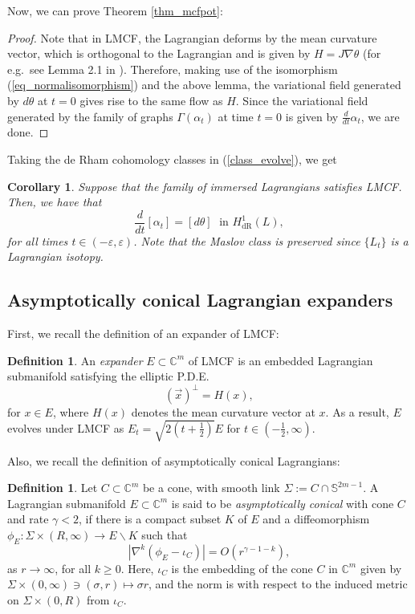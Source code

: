 \documentclass[10pt, a4paper]{article}
\theoremstyle{plain}%
\newtheorem{coro}[theorem]{Corollary}
\theoremstyle{definition}
\newtheorem{defn}[theorem]{Definition}
\numberwithin{figure}{section}
\numberwithin{equation}{section}
\newcommand{\bC}{\mathbb{C}}
\newcommand{\bS}{\mathbb{S}}
\begin{document}
Now, we can prove Theorem \ref{thm_mcfpot}:	

\begin{proof}
	Note that in LMCF, the Lagrangian deforms by the mean curvature vector, which is orthogonal to the Lagrangian and is given by $H=J\nabla \theta$ (for e.g.\ see Lemma 2.1 in \cite{TY02}). Therefore, making use of the isomorphism (\ref{eq_normalisomorphism}) and the above lemma, the variational field generated by $d\theta$ at $t=0$ gives rise to the same flow as $H$. Since the variational field generated by the family of graphs $\Gamma(\alpha_t)$ at time $t=0$ is given by $\frac{d}{dt}\alpha_t$, we are done.
\end{proof}

Taking the de Rham cohomology classes in (\ref{class_evolve}), we get
\begin{coro}\label{cor_classevolve}
    Suppose that the family of immersed Lagrangians satisfies LMCF. Then, we have that 
    \begin{equation}\label{eq_mcfpotcoh}
      \frac{d}{dt}[\alpha_t]=[d\theta] \; \textrm{ in } H^1_{\textrm{dR}}(L),
    \end{equation}
    for all times $t\in(-\varepsilon,\varepsilon)$. Note that the Maslov class is preserved since $\{L_t\}$ is a Lagrangian isotopy.
\end{coro}



\subsection{Asymptotically conical Lagrangian expanders}

First, we recall the definition of an expander of LMCF:
\begin{defn}
	An \textit{expander} $E\subset \mathbb{C}^m$ of LMCF is an embedded Lagrangian submanifold satisfying the elliptic P.D.E.
	\[
	(\overrightarrow{x})^\perp =  H(x),
	\]
	for $x\in E$, where $H(x)$ denotes the mean curvature vector at $x$. As a result, $E$ evolves under LMCF as $E_t = \sqrt{2(t+\frac{1}{2})}E$ for $t\in(-\frac{1}{2},\infty)$.
\end{defn}
Also, we recall the definition of asymptotically conical Lagrangians:
\begin{defn}\label{def_asymptoticallyconical}
    Let $C\subset \bC^m$ be a cone, with smooth link $\Sigma := C\cap \bS^{2m-1}$. A Lagrangian submanifold $E \subset \mathbb{C}^m$ is said to be \textit{asymptotically conical} with cone $C$ and rate $\gamma <2$, if there is a compact subset $K$ of $E$ and a diffeomorphism $\phi_E : \Sigma\times(R,\infty) \rightarrow E\backslash K$ such that \[
	|\nabla^k(\phi_E - \iota_C)| = O(r^{\gamma-1-k}),
	\]
	as $r\rightarrow \infty$, for all $k\geq 0$. Here, $\iota_C$ is the embedding of the cone $C$ in $\mathbb{C}^m$ given by $\Sigma\times(0,\infty) \ni (\sigma,r)\mapsto \sigma r$, and the norm is with respect to the induced metric on $\Sigma\times (0,R)$ from $\iota_C$.
\end{defn}
\end{document}
